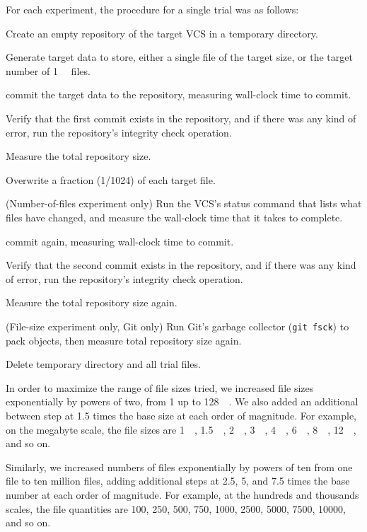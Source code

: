 For each experiment, the procedure for a single trial was as follows:
\begin{tight_enumerate}
    \item Create an empty \gls{repository} of the target \gls{VCS} in a temporary directory.
    \item Generate target data to store, either a single file of the target size, or the target number of \SI{1}{\kibi\byte} files.
    \item \Gls{commit} the target data to the \gls{repository}, measuring wall-clock time to \gls{commit}.
    \item Verify that the first \gls{commit} exists in the \gls{repository}, and if there was any kind of error, run the \gls{repository}'s integrity check operation.
    \item Measure the total \gls{repository} size.
    \item Overwrite a fraction (\num{1/1024}) of each target file.
    \item (Number-of-files experiment only) Run the \gls{VCS}'s status command that lists what files have changed, and measure the wall-clock time that it takes to complete.
    \item \Gls{commit} again, measuring wall-clock time to \gls{commit}.
    \item Verify that the second \gls{commit} exists in the \gls{repository}, and if there was any kind of error, run the \gls{repository}'s integrity check operation.
    \item Measure the total \gls{repository} size again.
    \item (File-size experiment only, Git only) Run Git's garbage collector (\lstinline{git fsck}) to pack objects, then measure total \gls{repository} size again.
    \item Delete temporary directory and all trial files.
\end{tight_enumerate}

In order to maximize the range of file sizes tried, we increased file sizes exponentially by powers of two, from \SI{1}{\byte} up to \SI{128}{\gibi\byte}.
We also added an additional between step at \num{1.5} times the base size at each order of magnitude.
For example, on the megabyte scale, the file sizes are \SI{1}{\mebi\byte}, \SI{1.5}{\mebi\byte}, \SI{2}{\mebi\byte}, \SI{3}{\mebi\byte}, \SI{4}{\mebi\byte}, \SI{6}{\mebi\byte}, \SI{8}{\mebi\byte}, \SI{12}{\mebi\byte}, and so on.

Similarly, we increased numbers of files exponentially by powers of ten from one file to ten million files, adding additional steps at \num{2.5}, \num{5}, and \num{7.5} times the base number at each order of magnitude.
For example, at the hundreds and thousands scales, the file quantities are \num{100}, \num{250}, \num{500}, \num{750}, \num{1000}, \num{2500}, \num{5000}, \num{7500}, \num{10000}, and so on.

